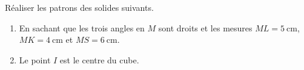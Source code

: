 
\begin{exercice}\label{exo2smath-0184}

    Réaliser les patrons des solides suivants.
            

    \begin{enumerate}

    \item
    En sachant que les trois angles en \( M\) sont droits et les mesures \( ML=\SI{5}{\centi\meter}\), \( MK=\SI{4}{\centi\meter}\) et \( MS=\SI{6}{\centi\meter}\). 

\item\label{ItemTDFMooPuUJaDii}

    Le point \( I\) est le centre du cube.
    \end{enumerate}

      
   


\end{exercice}
